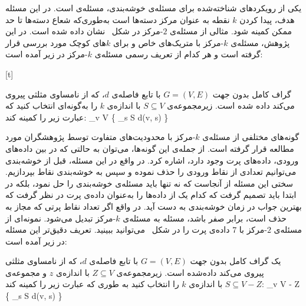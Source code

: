 یکی از رویکردهای شناخته‌شده برای مسئله‌ی خوشه‌بندی، مسئله‌ی  است.
در این مسئله هدف، پیدا کردن $k$ نقطه به عنوان مرکز دسته‌ها است به‌طوری‌که شعاع دسته‌ها تا حد ممکن کمینه شود.
مثالی از مسئله‌ی $2$-مرکز در شکل~ نشان داده شده است.
در این پژوهش، مسئله‌ی $k$-مرکز با متریک‌های خاص و برای $k$های کوچک مورد بررسی قرار گرفته است و هر کدام از‌ 
تعریف رسمی مسئله‌ی $k$-مرکز در زیر آمده است:

[t]
\vspace{1em}

  گراف کامل بدون جهت $G = (V, E)$ با تابع فاصله‌ی $d$، 
که از نامساوی مثلثی پیروی می‌کند داده ‌شده است.
زیرمجموعه‌ی $S \subseteq V$ با اندازه‌ی $k$ را به‌گونه‌ای انتخاب کنید که عبارت زیر را کمینه کند:
\max_{v \in V} \{ \min_{s \in S} d(v, s) \}

گونه‌های مختلفی از مسئله‌ی $k$-مرکز با محدودیت‌های متفاوت توسط پژوهشگران مورد مطالعه قرار گرفته است.
از جمله‌ی این گونه‌ها، می‌توان به حالتی که در بین داده‌های ورودی، داده‌های پرت وجود دارد، اشاره کرد.
در واقع در این مسئله، قبل از خوشه‌بندی می‌توانیم تعدادی از نقاط ورودی را حذف نموده و سپس به خوشه‌بندی نقاط بپردازیم.
سختی این مسئله از آنجاست که نه تنها باید مسئله‌ی خوشه‌بندی را حل نمود، بلکه در ابتدا باید تصمیم گرفت که کدام یک از داده‌ها را به‌عنوان داده‌ی پرت در نظر گرفت که بهترین جواب در زمان خوشه‌بندی به دست آید.
در واقع اگر تعداد نقاط پرتی که مجاز به حذف است، برابر صفر باشد، مسئله به مسئله‌ی $k$-مرکز تبدیل می‌شود.
نمونه‌ای از مسئله‌ی $2$-مرکز با $7$ داده‌ی پرت را در شکل~ می‌توانید ببینید.
تعریف دقیق‌تر این مسئله در زیر آمده است:

 یک گراف کامل بدون جهت $G = (V, E)$ با تابع فاصله‌ی $d$، که از نامساوی مثلثی پیروی می‌کند داده‌شده است.
زیرمجموعه‌ی $Z \subseteq V$ با اندازه‌ی $z$ و  مجموعه‌ی $S \subseteq V - Z$ با اندازه‌ی $k$ را انتخاب کنید به‌ طوری ‌که عبارت زیر را کمینه کند:
\max_{v \in V - Z} \{ \min_{s \in S} d(v, s) \}


